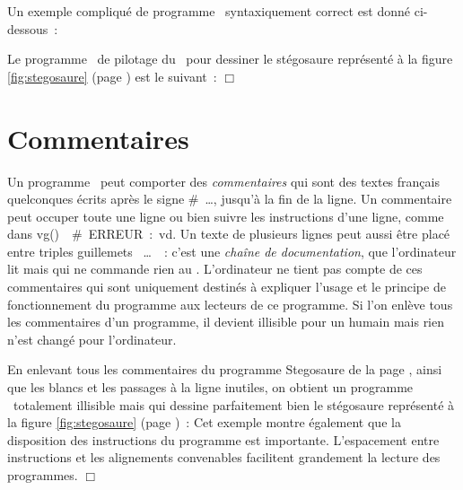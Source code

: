 Un exemple compliqué de programme \python\ syntaxiquement correct
est donné ci-\hbox{dessous :}
\begin{exemple}[Le stégosaure]{\rm
Le programme \python\ de pilotage du \robot\ pour
dessiner le sté\-go\-sau\-re re\-pré\-sen\-té  à la fi\-gu\-re
\ref{fig:stegosaure} (page \pageref{fig:stegosaure}) est le \hbox{suivant :}
\label{prog:Stegosaure} 
\noindent $\Box$ }\end{exemple}

\section{Commentaires} 

Un programme \python\ peut comporter des {\em commentaires} qui sont
des textes français quelconques écrits après le signe {\cmt \#\ \ldots}, jusqu'à la fin de la 
ligne. Un commentaire peut occuper toute une ligne ou bien suivre les instructions 
d'une ligne, comme dans {\idt vg()\ \ }{\cmt \#\ ERREUR\ :\ vd}.
Un texte de plusieurs lignes peut aussi être placé entre triples guillemets 
{\cha {}\ \ldots\ }~: c'est une 
{\em chaîne de documentation}, que l'ordinateur 
lit mais qui ne commande rien au \robot.
L'or\-di\-na\-teur ne tient pas compte de ces commentaires qui sont uniquement
destinés à expliquer l'usage et le principe de fonctionnement du
programme aux lecteurs de ce programme. Si l'on enlève tous les
commentaires d'un programme, il devient illisible pour un humain mais
rien n'est changé pour l'or\-di\-na\-teur.

\begin{exemple}{\rm
En enlevant tous les com\-men\-tai\-res du programme {\idt Stegosaure}
de la page \pageref{prog:Stegosaure}, ainsi que les blancs et les passages à la 
ligne inutiles, on obtient un programme \python\
totalement illisible mais qui dessine parfaitement bien le 
sté\-go\-sau\-re re\-pré\-sen\-té  à la fi\-gu\-re
\ref{fig:stegosaure} (page \hbox{\pageref{fig:stegosaure}) :}
{\small}
Cet exemple montre également que la disposition des instructions du
programme est importante. L'espacement entre instructions et les
alignements convenables facilitent grandement la lecture des
programmes.
\noindent $\Box$ }\end{exemple}



